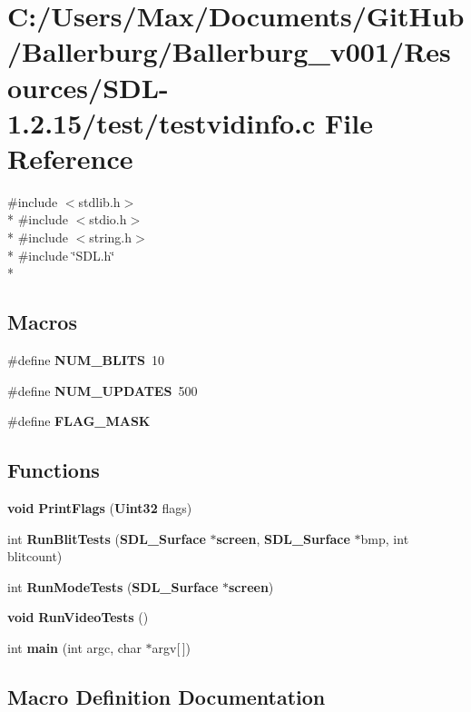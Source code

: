 \section{C\+:/\+Users/\+Max/\+Documents/\+Git\+Hub/\+Ballerburg/\+Ballerburg\+\_\+v001/\+Resources/\+S\+D\+L-\/1.2.15/test/testvidinfo.c File Reference}
\label{testvidinfo_8c}
{\ttfamily \#include $<$stdlib.\+h$>$}\\*
{\ttfamily \#include $<$stdio.\+h$>$}\\*
{\ttfamily \#include $<$string.\+h$>$}\\*
{\ttfamily \#include \char`\"{}S\+D\+L.\+h\char`\"{}}\\*
\subsection*{Macros}
\begin{DoxyCompactItemize}
\item 
\#define {\bf N\+U\+M\+\_\+\+B\+L\+I\+T\+S}~10
\item 
\#define {\bf N\+U\+M\+\_\+\+U\+P\+D\+A\+T\+E\+S}~500
\item 
\#define {\bf F\+L\+A\+G\+\_\+\+M\+A\+S\+K}
\end{DoxyCompactItemize}
\subsection*{Functions}
\begin{DoxyCompactItemize}
\item 
{\bf void} {\bf Print\+Flags} ({\bf Uint32} flags)
\item 
int {\bf Run\+Blit\+Tests} ({\bf S\+D\+L\+\_\+\+Surface} $\ast${\bf screen}, {\bf S\+D\+L\+\_\+\+Surface} $\ast$bmp, int blitcount)
\item 
int {\bf Run\+Mode\+Tests} ({\bf S\+D\+L\+\_\+\+Surface} $\ast${\bf screen})
\item 
{\bf void} {\bf Run\+Video\+Tests} ()
\item 
int {\bf main} (int argc, char $\ast$argv[$\,$])
\end{DoxyCompactItemize}


\subsection{Macro Definition Documentation}
